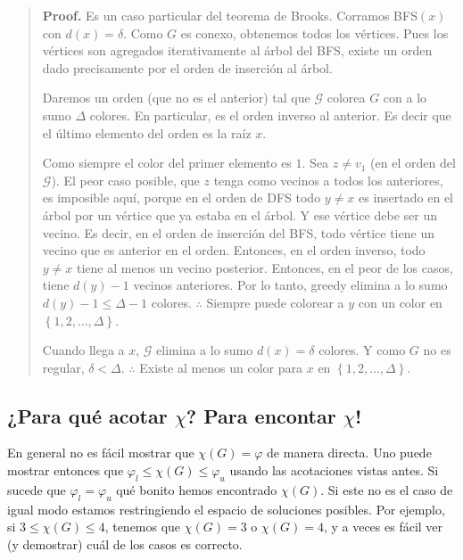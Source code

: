 \documentclass[a4paper]{article}
\begin{document}
\small
\begin{quote}

\textbf{Proof.} Es un caso particular del teorema de Brooks. Corramos BFS$(x)$
con $d(x) = \delta$.
Como $G$ es conexo, obtenemos todos los vértices. Pues los vértices son
agregados iterativamente al árbol del BFS, existe un orden dado precisamente por
el orden de inserción al árbol.

Daremos un orden (que no es el anterior) tal que $\mathscr{G}$ colorea $G$ con a lo
sumo $\Delta$ colores. En particular, es el orden inverso al anterior. Es decir
que el último elemento del orden es la raíz $x$.

Como siempre el color del primer elemento es $1$. Sea $z \neq v_1$ (en el orden
del $\mathscr{G}$). El peor caso posible, que $z$ tenga como vecinos a todos los
anteriores, es imposible aquí, porque en el orden de DFS todo $y \neq x$ es
insertado en el árbol por un vértice que ya estaba en el árbol. Y ese vértice
debe ser un vecino. Es decir, en el orden de inserción del BFS, todo vértice
tiene un vecino que es anterior en el orden. Entonces, en el orden inverso, todo
$y \neq x$ tiene al menos un vecino posterior. Entonces, en el peor de los
casos, tiene $d(y) - 1$ vecinos anteriores. Por lo tanto, greedy elimina a lo
sumo $d(y) -
1 \leq \Delta - 1$ colores. $\therefore $ Siempre puede colorear a $y$ con un
color en $\left\{ 1, 2, \ldots, \Delta \right\} $.

Cuando llega a $x$, $\mathscr{G}$ elimina a lo sumo $d(x) = \delta$ colores. Y como $G$
no es regular, $\delta < \Delta$. $\therefore $ Existe al menos un color para
$x$ en $\left\{ 1, 2, \ldots, \Delta \right\} $.

\end{quote}
\normalsize


\subsection{¿Para qué acotar $\chi$? Para encontar $\chi$!}

En general no es fácil mostrar que $\chi(G) = \varphi$ de manera directa. Uno
puede mostrar entonces que $\varphi_{l} \leq \chi(G) \leq \varphi_{u}$ usando
las acotaciones vistas antes. Si sucede que $\varphi_l = \varphi_u$ qué bonito
hemos encontrado $\chi(G)$. Si este no es el caso de igual modo estamos
restringiendo el espacio de soluciones posibles. Por ejemplo, si $3 \leq \chi(G)
\leq 4$, tenemos que $\chi(G) = 3$ o $\chi(G) = 4$, y a veces es fácil ver (y
demostrar) cuál de los casos es correcto.
\end{document}
